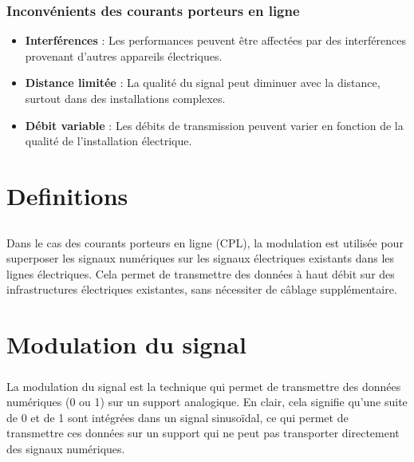 \documentclass[a4paper,draft,twocolumn]{report}
\begin{document}
\subsection{Inconvénients des courants porteurs en ligne}
\begin{itemize}
    \item \textbf{Interférences} : Les performances peuvent être affectées par des interférences provenant d'autres appareils électriques.
    \item \textbf{Distance limitée} : La qualité du signal peut diminuer avec la distance, surtout dans des installations complexes.
    \item \textbf{Débit variable} : Les débits de transmission peuvent varier en fonction de la qualité de l'installation électrique.
\end{itemize}

\appendix
\chapter{Definitions}
\section{}




\paragraph{}Dans le cas des courants porteurs en ligne (CPL), la modulation est utilisée pour superposer les signaux numériques sur les signaux électriques existants dans les lignes électriques. Cela permet de transmettre des données à haut débit sur des infrastructures électriques existantes, sans nécessiter de câblage supplémentaire.
\chapter{Modulation du signal}

\paragraph{}La modulation du signal est la technique qui permet de transmettre des données numériques (0 ou 1) sur un support analogique. En clair, cela signifie qu'une suite de 0 et de 1 sont intégrées dans un signal sinusoïdal, ce qui permet de transmettre ces données sur un support qui ne peut pas transporter directement des signaux numériques. 
\end{document}
